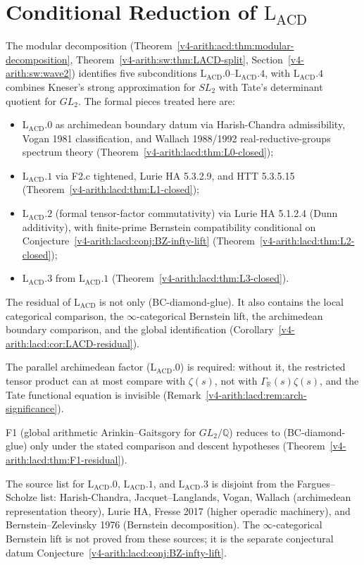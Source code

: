 \section{Conditional Reduction of \(\mathrm{L}_{\mathrm{ACD}}\)}
\label{v4-arith:lacd:summary}

The modular decomposition (Theorem~\ref{v4-arith:acd:thm:modular-decomposition},
Theorem~\ref{v4-arith:sw:thm:LACD-split}, Section~\ref{v4-arith:sw:wave2}) identifies
five subconditions
\(\mathrm{L}_{\mathrm{ACD}}.0\)--\(\mathrm{L}_{\mathrm{ACD}}.4\), with
\(\mathrm{L}_{\mathrm{ACD}}.4\) combines Kneser's strong approximation
for \(SL_{2}\) with Tate's determinant quotient for \(GL_{2}\). The
formal pieces treated here are:
\begin{itemize}
\item \(\mathrm{L}_{\mathrm{ACD}}.0\) as archimedean boundary datum via Harish-Chandra admissibility,
Vogan 1981 classification, and Wallach 1988/1992 real-reductive-groups
spectrum theory (Theorem~\ref{v4-arith:lacd:thm:L0-closed});
\item \(\mathrm{L}_{\mathrm{ACD}}.1\) via F2.c tightened, Lurie HA
5.3.2.9, and HTT 5.3.5.15
(Theorem~\ref{v4-arith:lacd:thm:L1-closed});
\item \(\mathrm{L}_{\mathrm{ACD}}.2\) (formal tensor-factor commutativity)
via Lurie HA 5.1.2.4 (Dunn additivity), with finite-prime Bernstein
compatibility conditional on Conjecture~\ref{v4-arith:lacd:conj:BZ-infty-lift}
(Theorem~\ref{v4-arith:lacd:thm:L2-closed});
\item \(\mathrm{L}_{\mathrm{ACD}}.3\) from \(\mathrm{L}_{\mathrm{ACD}}.1\)
(Theorem~\ref{v4-arith:lacd:thm:L3-closed}).
\end{itemize}
The residual of \(\mathrm{L}_{\mathrm{ACD}}\) is not only
(BC-diamond-glue). It also contains the local categorical comparison,
the \(\infty\)-categorical Bernstein lift, the archimedean boundary
comparison, and the global identification
(Corollary~\ref{v4-arith:lacd:cor:LACD-residual}).

The parallel archimedean factor
(\(\mathrm{L}_{\mathrm{ACD}}.0\)) is required: without it, the
restricted tensor product can at most compare with \(\zeta(s)\), not
with \(\Gamma_{\mathbb{R}}(s)\zeta(s)\), and the Tate functional
equation is invisible
(Remark~\ref{v4-arith:lacd:rem:arch-significance}).

F1 (global arithmetic Arinkin--Gaitsgory for \(GL_{2}/\mathbb{Q}\))
reduces to (BC-diamond-glue) only under the stated comparison and
descent hypotheses
(Theorem~\ref{v4-arith:lacd:thm:F1-residual}).

The source list for \(\mathrm{L}_{\mathrm{ACD}}.0\),
\(\mathrm{L}_{\mathrm{ACD}}.1\), and \(\mathrm{L}_{\mathrm{ACD}}.3\) is
disjoint from the Fargues--Scholze list: Harish-Chandra,
Jacquet--Langlands, Vogan, Wallach (archimedean representation
theory), Lurie HA, Fresse 2017 (higher operadic machinery), and
Bernstein--Zelevinsky 1976 (Bernstein decomposition). The
\(\infty\)-categorical Bernstein lift is not proved from these sources;
it is the separate conjectural datum
Conjecture~\ref{v4-arith:lacd:conj:BZ-infty-lift}.
